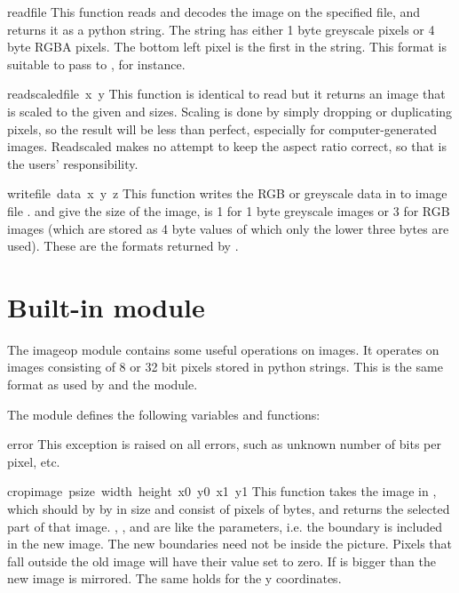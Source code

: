 \begin{funcdesc}{read}{file}
This function reads and decodes the image on the specified file, and
returns it as a python string. The string has either 1 byte greyscale
pixels or 4 byte RGBA pixels. The bottom left pixel is the first in
the string. This format is suitable to pass to ,
for instance.
\end{funcdesc}

\begin{funcdesc}{readscaled}{file\, x\, y}
This function is identical to read but it returns an image that is
scaled to the given  and  sizes. Scaling is done by
simply dropping or duplicating pixels, so the result will be less than
perfect, especially for computer-generated images. Readscaled makes no
attempt to keep the aspect ratio correct, so that is the users'
responsibility.
\end{funcdesc}

\begin{funcdesc}{write}{file\, data\, x\, y\, z}
This function writes the RGB or greyscale data in  to image
file .  and  give the size of the image,
 is 1 for 1 byte greyscale images or 3 for RGB images (which are
stored as 4 byte values of which only the lower three bytes are used).
These are the formats returned by .
\end{funcdesc}

\section{Built-in module }

The imageop module contains some useful operations on images.
It operates on images consisting of 8 or 32 bit pixels
stored in python strings. This is the same format as used
by  and the  module.

The module defines the following variables and functions:

\renewcommand{\indexsubitem}{(in module imageop)}

\begin{excdesc}{error}
This exception is raised on all errors, such as unknown number of bits
per pixel, etc.
\end{excdesc}


\begin{funcdesc}{crop}{image\, psize\, width\, height\, x0\, y0\, x1\, y1}
This function takes the image in , which should by
 by  in size and consist of pixels of
 bytes, and returns the selected part of that image. ,
,  and  are like the 
parameters, i.e. the boundary is included in the new image.
The new boundaries need not be inside the picture. Pixels that fall
outside the old image will have their value set to zero.
If  is bigger than  the new image is mirrored. The
same holds for the y coordinates.
\end{funcdesc}

